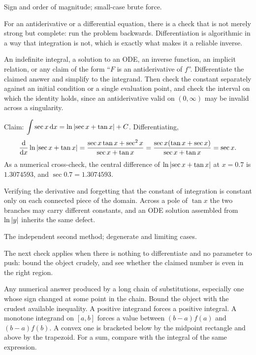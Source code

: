 \begin{seealsob}Sign and order of magnitude; small-case brute force.\end{seealsob}

For an antiderivative or a differential equation, there is a check that is not merely strong but complete: run the problem backwards. Differentiation is algorithmic in a way that integration is not, which is exactly what makes it a reliable inverse.

\cue An indefinite integral, a solution to an ODE, an inverse function, an implicit relation, or any claim of the form ``$F$ is an antiderivative of $f$''.
\method Differentiate the claimed answer and simplify to the integrand. Then check the constant separately against an initial condition or a single evaluation point, and check the interval on which the identity holds, since an antiderivative valid on $(0,\infty)$ may be invalid across a singularity.

\begin{worked}
Claim: $\displaystyle\int\sec x\,\mathrm{d} x=\ln\left\lvert \sec x+\tan x\right\rvert+C$. Differentiating,
\[
\frac{\mathrm{d}}{\mathrm{d}x}\ln\left\lvert \sec x+\tan x\right\rvert=\frac{\sec x\tan x+\sec^{2}x}{\sec x+\tan x}=\frac{\sec x(\tan x+\sec x)}{\sec x+\tan x}=\sec x .
\]
As a numerical cross-check, the central difference of $\ln\left\lvert \sec x+\tan x\right\rvert$ at $x=0.7$ is $1.3074593$, and $\sec 0.7=1.3074593$.
\end{worked}

\begin{trap}
Verifying the derivative and forgetting that the constant of integration is constant only on each connected piece of the domain. Across a pole of $\tan x$ the two branches may carry different constants, and an ODE solution assembled from $\ln\left\lvert y\right\rvert$ inherits the same defect.
\end{trap}

\begin{seealsob}The independent second method; degenerate and limiting cases.\end{seealsob}

The next check applies when there is nothing to differentiate and no parameter to push: bound the object crudely, and see whether the claimed number is even in the right region.

\cue Any numerical answer produced by a long chain of substitutions, especially one whose sign changed at some point in the chain.
\method Bound the object with the crudest available inequality. A positive integrand forces a positive integral. A monotone integrand on $[a,b]$ forces a value between $(b-a)f(a)$ and $(b-a)f(b)$. A convex one is bracketed below by the midpoint rectangle and above by the trapezoid. For a sum, compare with the integral of the same expression.

